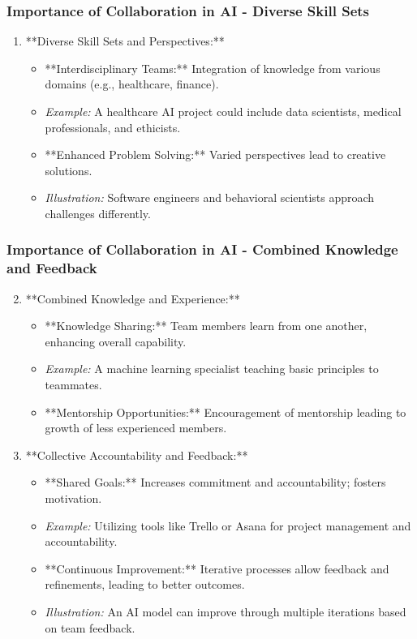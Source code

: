 \documentclass[aspectratio=169]{beamer}
\begin{document}
\begin{frame}[fragile]
    \frametitle{Importance of Collaboration in AI - Diverse Skill Sets}
    \begin{enumerate}
        \item **Diverse Skill Sets and Perspectives:**
            \begin{itemize}
                \item **Interdisciplinary Teams:** Integration of knowledge from various domains (e.g., healthcare, finance).
                \item \textit{Example:} A healthcare AI project could include data scientists, medical professionals, and ethicists.
                \item **Enhanced Problem Solving:** Varied perspectives lead to creative solutions.
                \item \textit{Illustration:} Software engineers and behavioral scientists approach challenges differently.
            \end{itemize}
    \end{enumerate}
\end{frame}

\begin{frame}[fragile]
    \frametitle{Importance of Collaboration in AI - Combined Knowledge and Feedback}
    \begin{enumerate}
        \setcounter{enumi}{1}
        \item **Combined Knowledge and Experience:**
            \begin{itemize}
                \item **Knowledge Sharing:** Team members learn from one another, enhancing overall capability.
                \item \textit{Example:} A machine learning specialist teaching basic principles to teammates.
                \item **Mentorship Opportunities:** Encouragement of mentorship leading to growth of less experienced members.
            \end{itemize}

        \item **Collective Accountability and Feedback:**
            \begin{itemize}
                \item **Shared Goals:** Increases commitment and accountability; fosters motivation.
                \item \textit{Example:} Utilizing tools like Trello or Asana for project management and accountability.
                \item **Continuous Improvement:** Iterative processes allow feedback and refinements, leading to better outcomes.
                \item \textit{Illustration:} An AI model can improve through multiple iterations based on team feedback.
            \end{itemize}
    \end{enumerate}
\end{frame}
\end{document}
